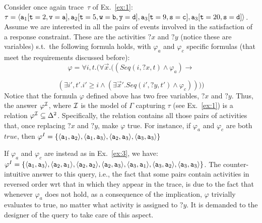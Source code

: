 \begin{example}\label{ex:q-check}
	Consider once again trace~$\tau$ of Ex.~\ref{ex:1}:
$\tau=\langle\mathtt{a}_1[
	\mathtt{t}=2,
	\mathtt{v}=\mathtt{a}
],
\mathtt{a}_2[
	\mathtt{t}=5,
	\mathtt{w}=\mathtt{b},
	\mathtt{y}=\mathtt{d}
],
\mathtt{a}_3[
	\mathtt{t}=9,
	\mathtt{s}=\mathtt{c}
],
\mathtt{a}_3[
	\mathtt{t}=20,
	\mathtt{s}=\mathtt{d}
]\rangle$.
Assume we are interested in all the pairs of events involved in the
satisfaction of a response constraint.
These are the activities
$?x$ and $?y$ (notice these are variables) s.t.~the following formula
holds, with $\varphi_a$ and $\varphi_c$ specific formulas
(that meet the requirements discussed before):
$$\varphi=\forall i,t.(
			\forall\vec x.(
				(Seq(i,?x,t)\land \varphi_a)
					\rightarrow 
$$

\vspace{-5mm}
$$
				(\exists i',t'.i'\geq i\land(
					\exists\vec x'.
						Seq(i',?y,t')\land\varphi_c)
				)
			)
		)
		$$
Notice that the formula $\varphi$ defined above has two
free variables, $?x$ and $?y$. Thus, the answer $\varphi^{\mathcal{I}}$, where $\mathcal{I}$ is
the model of $\Gamma$ capturing $\tau$ (see Ex.~\ref{ex:1}) is
a relation $\varphi^{\mathcal{I}}\subseteq \Delta^2$. Specifically, the
relation contains all those pairs of activities that, once
replacing $?x$ and $?y$, make $\varphi$ true.
For instance, if $\varphi_a$ and $\varphi_c$ are both $true$, then
$\varphi^I=\{
			\langle \mathtt{a}_1, \mathtt{a}_2\rangle,
			\langle \mathtt{a}_1, \mathtt{a}_3\rangle,
			\langle \mathtt{a}_2, \mathtt{a}_3\rangle,
			\langle \mathtt{a}_3, \mathtt{a}_3\rangle\}$

If $\varphi_a$ and $\varphi_c$ are instead as in Ex.~\ref{ex:3},
we have:
$\varphi^I=\{
			\langle \mathtt{a}_1, \mathtt{a}_3\rangle,\allowbreak
			\langle \mathtt{a}_2, \mathtt{a}_1\rangle,\allowbreak
			\langle \mathtt{a}_2, \mathtt{a}_2\rangle,\allowbreak
			\langle \mathtt{a}_2, \mathtt{a}_3\rangle,
			\langle \mathtt{a}_3, \mathtt{a}_1\rangle,
			\langle \mathtt{a}_3, \mathtt{a}_2\rangle,
			\langle \mathtt{a}_3, \mathtt{a}_3\rangle\}
			$.
The counter-intuitive answer to this query, i.e., the fact
that some pairs contain activities in reversed order wrt that in
which they appear in the trace, is due to the fact
that whenever $\varphi_a$ does not hold, as a consequence of the
implication, $\varphi$ trivially evaluates to true, no
matter what activity is assigned to $?y$. It is demanded
to the designer of the query to take care of this aspect.
\end{example}
